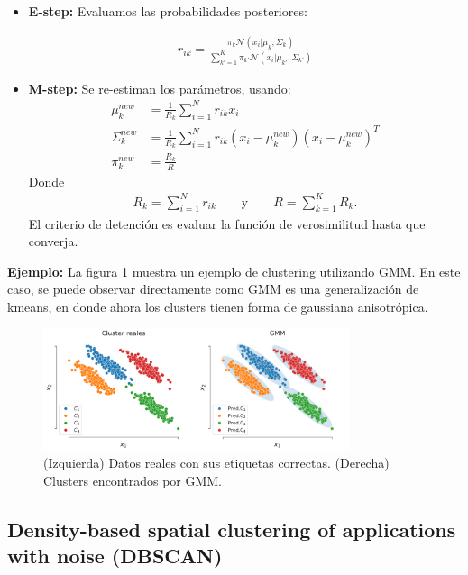 \begin{itemize}
    \item \textbf{E-step:} Evaluamos las probabilidades posteriores:
    
    \begin{align}
    r_{ik} = \frac{\pi_k \mathcal{N}(x_i| \mu_k,\Sigma_k)}{\sum_{k'=1}^K \pi_{k'}\mathcal{N}(x_i| \mu_{k'},\Sigma_{k'})}
    \end{align}
    \item \textbf{M-step:} Se re-estiman los parámetros, usando:
    \begin{align}
    \mu_k^{new} & = \frac{1}{R_k}\sum_{i=1}^N r_{ik}x_i\\
    \Sigma_k^{new} & = \frac{1}{R_k} \sum_{i=1}^N r_{ik}(x_i - \mu_k^{new})(x_i - \mu_k^{new})^T\\
    \pi_k^{new} & = \frac{R_k}{R}
    \end{align}
    Donde
    \begin{align*}
    R_k = \sum_{i=1}^N r_{ik} \qquad \text{y} \qquad R = \sum_{k=1}^K R_k.
    \end{align*}
    El criterio de detención es evaluar la función de verosimilitud hasta que converja.
\end{itemize}

\underline{\textbf{Ejemplo:}} La figura \ref{fig:gmm} muestra un ejemplo de clustering utilizando GMM. En este caso, se puede observar directamente como GMM es una generalización de kmeans, en donde ahora los clusters tienen forma de gaussiana anisotrópica.

\begin{figure}[ht]
  \centering
  \includegraphics[width=0.8\textwidth]{img/cap7_gmm}
  \caption{(Izquierda) Datos reales con sus etiquetas correctas. (Derecha) Clusters encontrados por GMM.}
  \label{fig:gmm}
\end{figure}


\subsection{Density-based spatial clustering of applications with noise (DBSCAN)}

